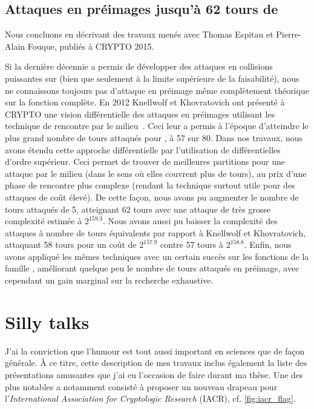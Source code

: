 \subsection{Attaques en préimages jusqu'à 62 tours de \shaone \cite{DBLP:conf/crypto/EspitauFK15}}

Nous concluons en décrivant des travaux menés avec Thomas Espitau et Pierre-Alain Fouque, publiés à CRYPTO 2015.

\medskip

Si la dernière décennie a permis de développer des attaques en collisions puissantes sur \shaone (bien que seulement à la limite supérieure de la faisabilité), nous ne connaissons toujours
pas d'attaque en préimage même complètement théorique sur la fonction complète.
En 2012 Knellwolf et Khovratovich ont présenté à CRYPTO une vision différentielle des attaques en préimages utilisant les technique de rencontre par le milieu~\cite{DBLP:conf/crypto/KnellwolfK12}.
Ceci leur a permis à l'époque d'atteindre le plus grand nombre de tours attaqués pour \shaone, à 57 sur 80.
Dans nos travaux, nous avons étendu cette approche différentielle par l'utilisation de différentielles d'ordre supérieur. Ceci permet de trouver de meilleures partitions pour une attaque par
le milieu (dans le sens où elles couvrent plus de tours), au prix d'une phase de rencontre plus complexe (rendant la technique surtout utile pour des attaques de coût élevé). De cette façon,
nous avons pu augmenter le nombre de tours attaqués de 5, atteignant 62 tours avec une attaque de très grosse complexité estimée à $2^{159.3}$.
Nous avons aussi pu baisser la complexité des attaques à nombre
de tours équivalents par rapport à Knellwolf et Khovratovich, attaquant 58 tours pour un coût de $2^{157.9}$ contre 57 tours à $2^{158.8}$. Enfin, nous avons appliqué les mêmes
techniques avec un certain succès sur les fonctions de la famille \blake, améliorant quelque peu le nombre de tours attaqués en préimage, avec cependant un gain marginal sur la
recherche exhaustive. 


\section[Divertissements]{Silly talks}

J'ai la conviction que l'humour est tout aussi important en sciences que de façon générale. À ce titre, cette description de mes travaux inclus également la liste des présentations amusantes
que j'ai eu l'occasion de faire durant ma thèse. Une des plus notables a notamment consisté à proposer un nouveau drapeau pour l'\emph{International Association for Cryptologic
Research} (IACR), cf. \autoref{fig:iacr_flag}. 

